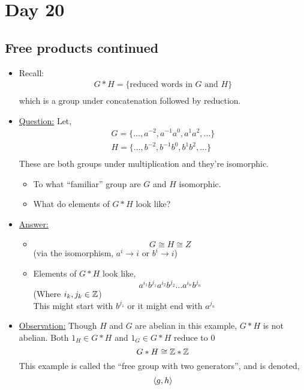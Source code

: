 \documentclass[../notes.tex]{subfiles}
\begin{document}
\section{Day 20}
\subsection{Free products continued}
\begin{itemize}
    \item Recall:
        \begin{align*}
            G*H=\{\text{reduced words in $G$ and $H$}\}\\
        \end{align*}
        which is a group under concatenation followed by reduction.
    \item \underline{Question:} Let,
        \begin{align*}
            G=\{\dots,a^{-2},a^{-1}a^{0},a^{1}a^{2},\dots \}\\
            H=\{\dots,b^{-2},b^{-1}b^{0},b^{1}b^{2},\dots \}\\
        \end{align*}
        These are both groups under multiplication and they're isomorphic.
        \begin{itemize}
            \item To what ``familiar'' group are $G$ and $H$ isomorphic.
            \item What do elements of $G*H$ look like?
        \end{itemize}
    \item \underline{Answer:}
        \begin{itemize}
            \item 
                \[
                    G\cong H \cong Z
                \]
                (via the isomorphism, $a^i\rightarrow i$ or $b^i \rightarrow i$)
            \item
                Elements of $G*H$ look like,
                \[
                    a^{i_1}b^{j_1}a^{i_2}b^{j_2}\dots a^{i_n}b^{j_n}
                \]
                (Where $i_k, j_k\in \mathbb{Z}$)\\
                This might start with $b^{j_1}$ or it might end with $a^{j_n}$
        \end{itemize}
    \item \underline{Observation:}
        Though $H$ and $G$ are abelian in this example, $G*H$ is not abelian.
        Both $1_H\in G*H$ and $1_G\in G*H$ reduce to $0$\\
        \[
            G*H\cong \mathbb{Z}*\mathbb{Z}
        \]
        This example is called the ``free group with two generators'', and
        is denoted,
        \[
            \langle g,h \rangle
        \]
\end{itemize}
\end{document}
